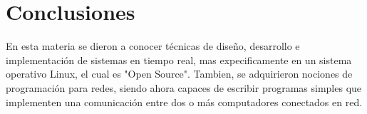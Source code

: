 \section{Conclusiones}
    En esta materia se dieron a conocer técnicas de diseño, desarrollo e implementación de sistemas en tiempo real, mas expecificamente en un sistema operativo Linux, el cual es "Open Source". Tambien, se adquirieron nociones de programación para redes, siendo ahora capaces de escribir programas simples que implementen una comunicación entre dos o más computadores conectados en red.
\\